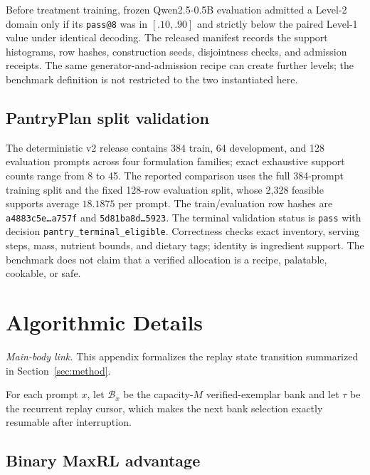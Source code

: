 Before treatment training, frozen Qwen2.5-0.5B evaluation admitted a Level-2
domain only if its \texttt{pass@8} was in $[.10,.90]$ and strictly below the
paired Level-1 value under identical decoding. The released manifest
 records the support
histograms, row hashes, construction seeds, disjointness checks, and admission
receipts. The same generator-and-admission recipe can create further levels;
the benchmark definition is not restricted to the two instantiated here.

\subsection{PantryPlan split validation}
\label{app:data-pantry}

The deterministic v2 release contains 384
train, 64 development, and 128 evaluation prompts across four formulation
families; exact exhaustive support counts range from 8 to 45. The reported
comparison uses the full 384-prompt training split and the
fixed 128-row evaluation split, whose 2,328 feasible supports average
$18.1875$ per prompt.
The train/evaluation row hashes are \texttt{a4883c5e\ldots a757f} and
\texttt{5d81ba8d\ldots5923}. The terminal validation status is \texttt{pass} with
decision \texttt{pantry\_terminal\_eligible}. Correctness checks exact inventory,
serving steps, mass, nutrient bounds, and dietary tags; identity is ingredient
support. The benchmark does not claim that a verified allocation is a recipe,
palatable, cookable, or safe.

\clearpage
\section{Algorithmic Details}
\label{app:algorithm}

\noindent\emph{Main-body link.} This appendix formalizes the replay state
transition summarized in Section~\ref{sec:method}.

For each prompt $x$, let $\mathcal B_x$ be the capacity-$M$ verified-exemplar
bank and let $\tau$ be the recurrent replay cursor, which makes the next
bank selection exactly resumable after interruption.

\subsection{Binary MaxRL advantage}
\label{app:binary-maxrl}

